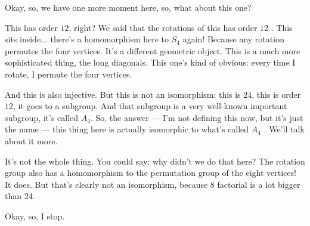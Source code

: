 \begin{speech}[00:42:34 - 00:43:53]
Okay, so, we have one more moment here, so, what about this one? 

This has order $12$, right? We said that the rotations of this has order $12$ . This sits inside... there's a homomorphism here to $S_4$ again!  Because any rotation permutes the four vertices. It's a different geometric object. This is a much more sophisticated thing, the long diagonals. This one's kind of obvious: every time I rotate, I permute the four vertices.

And this is also injective. But this is not an isomorphism: this is $24$, this is order $12$, it goes to a subgroup. And that subgroup is a very well-known important subgroup, it's called $A_4$. So, the answer --- I'm not defining this now, but it's just the name --- this thing here is actually isomorphic to what's called $A_4$ . We'll talk about it more.

It's not the whole thing. You could say: why didn't we do that here? The rotation group also has a homomorphism to the permutation group of the eight vertices! It does. But that's clearly not an isomorphism, because $8$ factorial is a lot bigger than $24$.

Okay, so, I stop. 
\end{speech}

